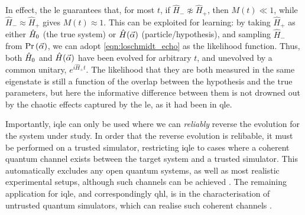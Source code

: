 \par 
In effect, the \gls{le} guarantees that, for most $t$, if $\hat{H}_{-} \not\approx \hat{H}_{+}$, then $M(t) \ll 1$, 
    while $\hat{H}_{-} \approx \hat{H}_{+}$ gives $M(t) \approx 1$. 
This can be exploited for learning: 
    by taking $\hat{H}_{+}$ as either $\hat{H}_0$ (the true system) or $\hat{H}(\vec{\alpha})$ (particle/hypothesis), 
    and sampling $\hat{H}_{-}$ from $\Pr\left(\vec{\alpha}\right)$, 
    we can adopt \cref{eqn:loschmidt_echo} as the \gls{likelihood} function.
Thus, both $\hat{H}_0$ and $\hat{H}(\vec{\alpha})$ have been evolved for arbitrary $t$, and unevolved by a common unitary, $e^{i\hat{H}_+ t}$.
The likelihood that they are both measured in the same eigenstate is still a function of the overlap between the 
    hypothesis and the true parameters, but here the informative difference between them is not drowned out by the chaotic effects captured by the \gls{le},
    as it had been in \gls{qle}.
\par 

Importantly, \gls{iqle} can only be used where we can \emph{reliably} reverse the evolution for the system under study. 
In order that the reverse evolution is relibable, it must be performed on a trusted simulator, 
    restricting \gls{iqle} to cases where a coherent quantum channel exists between the target
    system and a trusted simulator. 
This automatically excludes any open quantum systems, as well as most realistic 
    experimental setups, although such channels can be achieved \cite{hensen2015loophole}. 
The remaining application for \gls{iqle}, and correspondingly \gls{qhl}, 
    is in the characterisation of untrusted quantum simulators, 
    which can realise such coherent channels \cite{wang2017experimental}. 

